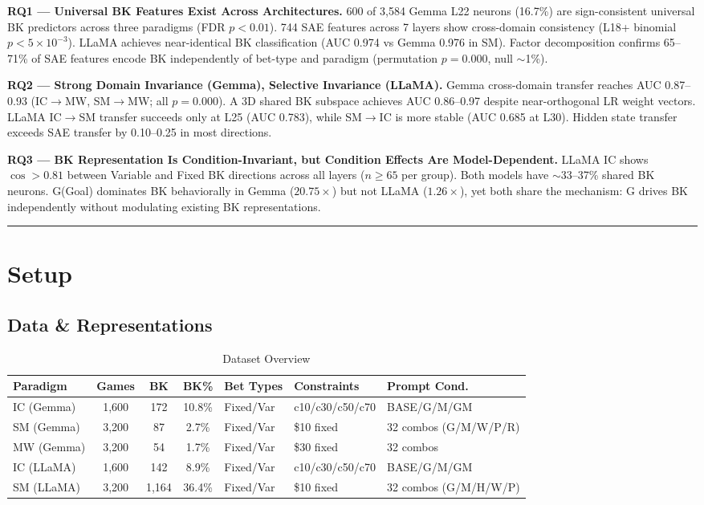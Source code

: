 \documentclass[11pt,a4paper]{article}
\begin{document}
\textbf{RQ1 --- Universal BK Features Exist Across Architectures.}
600 of 3,584 Gemma L22 neurons (16.7\%) are sign-consistent universal BK predictors across three paradigms (FDR $p<0.01$). 744 SAE features across 7 layers show cross-domain consistency (L18+ binomial $p<5\times10^{-3}$). LLaMA achieves near-identical BK classification (AUC 0.974 vs Gemma 0.976 in SM). Factor decomposition confirms 65--71\% of SAE features encode BK independently of bet-type and paradigm (permutation $p=0.000$, null $\sim$1\%).

\medskip\textbf{RQ2 --- Strong Domain Invariance (Gemma), Selective Invariance (LLaMA).}
Gemma cross-domain transfer reaches AUC 0.87--0.93 (IC$\rightarrow$MW, SM$\rightarrow$MW; all $p=0.000$). A 3D shared BK subspace achieves AUC 0.86--0.97 despite near-orthogonal LR weight vectors. LLaMA IC$\rightarrow$SM transfer succeeds only at L25 (AUC 0.783), while SM$\rightarrow$IC is more stable (AUC 0.685 at L30). Hidden state transfer exceeds SAE transfer by 0.10--0.25 in most directions.

\medskip\textbf{RQ3 --- BK Representation Is Condition-Invariant, but Condition Effects Are Model-Dependent.}
LLaMA IC shows $\cos>0.81$ between Variable and Fixed BK directions across all layers ($n\ge65$ per group). Both models have $\sim$33--37\% shared BK neurons. G(Goal) dominates BK behaviorally in Gemma ($20.75\times$) but not LLaMA ($1.26\times$), yet both share the mechanism: G drives BK independently without modulating existing BK representations.

\bigskip\hrule\bigskip

\section{Setup}

\subsection{Data \& Representations}

\begin{table}[H]
\centering
\caption{Dataset Overview}\label{tab:t1}
\footnotesize
\begin{tabular}{lccclll}
\toprule
Paradigm & Games & BK & BK\% & Bet Types & Constraints & Prompt Cond. \\
\midrule
IC (Gemma)  & 1,600 & 172   & 10.8\% & Fixed/Var & c10/c30/c50/c70 & BASE/G/M/GM \\
SM (Gemma)  & 3,200 & 87    & 2.7\%  & Fixed/Var & \$10 fixed      & 32 combos (G/M/W/P/R) \\
MW (Gemma)  & 3,200 & 54    & 1.7\%  & Fixed/Var & \$30 fixed      & 32 combos \\
IC (LLaMA)  & 1,600 & 142   & 8.9\%  & Fixed/Var & c10/c30/c50/c70 & BASE/G/M/GM \\
SM (LLaMA)  & 3,200 & 1,164 & 36.4\% & Fixed/Var & \$10 fixed      & 32 combos (G/M/H/W/P) \\
\bottomrule
\end{tabular}
\end{table}
\end{document}
